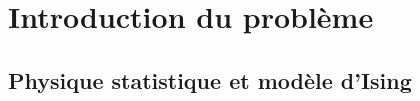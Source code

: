 \documentclass[9pt]{beamer}
\begin{document}
	\begin{frame}[t]
	\titlepage
	\end{frame}


	\begin{frame}
	\vspace*{22pt}
	\tableofcontents
	\end{frame}





\footHeadLine{}

\section{Introduction du problème}

\subsection{Physique statistique et modèle d'Ising}
\end{document}
